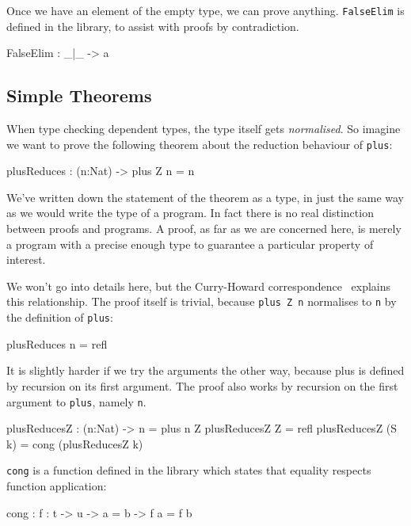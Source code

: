 Once we have an element of the empty type, we can prove anything.
\texttt{FalseElim} is defined in the library, to assist with proofs by contradiction.

\begin{code}
FalseElim : _|_ -> a
\end{code}

\subsection{Simple Theorems}

When type checking dependent types, the type itself gets \emph{normalised}.
So imagine we want to prove the following theorem about the reduction behaviour of \texttt{plus}:

\begin{code}
plusReduces : (n:Nat) -> plus Z n = n
\end{code}

\noindent
We've written down the statement of the theorem as a type, in just the same way as we would write the type of a program.
In fact there is no real distinction between proofs and programs.
A proof, as far as we are concerned here, is merely a program with a precise enough type to guarantee a particular property of interest.

We won't go into details here, but the Curry-Howard correspondence~\cite{howard} explains this relationship.
The proof itself is trivial, because \texttt{plus Z n} normalises to \texttt{n} by the definition of \texttt{plus}:

\begin{code}
plusReduces n = refl
\end{code}

\noindent
It is slightly harder if we try the arguments the other way, because plus is defined by recursion on its first argument.
The proof also works by recursion on the first argument to \texttt{plus}, namely \texttt{n}.

\begin{code}
plusReducesZ : (n:Nat) -> n = plus n Z
plusReducesZ Z = refl
plusReducesZ (S k) = cong (plusReducesZ k)
\end{code}

\noindent
\texttt{cong} is a function defined in the library which states that equality respects function application:

\begin{code}
cong : {f : t -> u} -> a = b -> f a = f b
\end{code}

